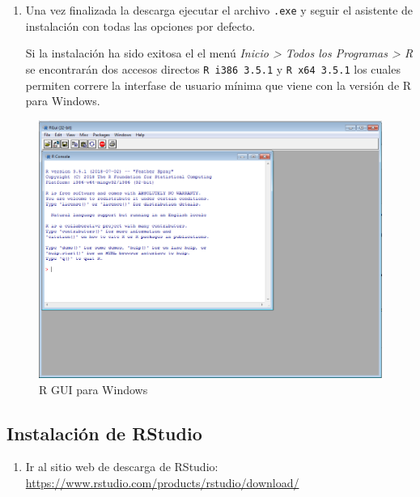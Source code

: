 \documentclass[a4paper]{book}
\providecommand{\tightlist}{%
  \setlength{\itemsep}{0pt}\setlength{\parskip}{0pt}}
\begin{document}
\begin{enumerate}
\def\labelenumi{\arabic{enumi})}
\setcounter{enumi}{1}
\item
  Una vez finalizada la descarga ejecutar el archivo \texttt{.exe} y
  seguir el asistente de instalación con todas las opciones por defecto.

  Si la instalación ha sido exitosa el el menú \emph{Inicio
  \textgreater{} Todos los Programas \textgreater{} R} se encontrarán
  dos accesos directos \texttt{R\ i386\ 3.5.1} y \texttt{R\ x64\ 3.5.1}
  los cuales permiten correre la interfase de usuario mínima que viene
  con la versión de R para Windows.
\end{enumerate}

\begin{figure}[h]

{\centering \includegraphics[width=0.75\linewidth,]{images/rgui} 

}

\caption{R GUI para Windows}\label{fig:unnamed-chunk-21}
\end{figure}

\hypertarget{instalacion-de-rstudio-1}{%
\subsection{Instalación de RStudio}\label{instalacion-de-rstudio-1}}

\begin{enumerate}
\def\labelenumi{\arabic{enumi})}
\tightlist
\item
  Ir al sitio web de descarga de RStudio:
  \url{https://www.rstudio.com/products/rstudio/download/}
\end{enumerate}
\end{document}
